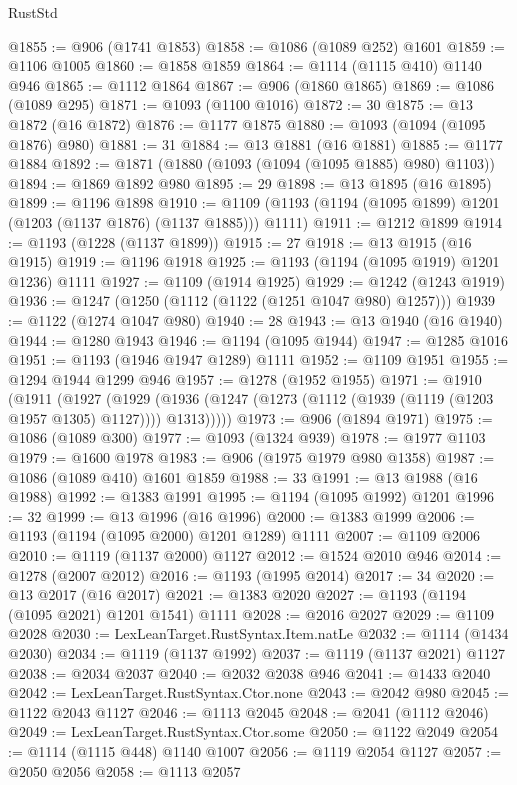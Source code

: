 \begin{lexlean}{RustStd}
\begin{coremodule}
@1855 := @906 (@1741 @1853)
@1858 := @1086 (@1089 @252) @1601
@1859 := @1106 @1005
@1860 := @1858 @1859
@1864 := @1114 (@1115 @410) @1140 @946
@1865 := @1112 @1864
@1867 := @906 (@1860 @1865)
@1869 := @1086 (@1089 @295)
@1871 := @1093 (@1100 @1016)
@1872 := 30
@1875 := @13 @1872 (@16 @1872)
@1876 := @1177 @1875
@1880 := @1093 (@1094 (@1095 @1876) @980)
@1881 := 31
@1884 := @13 @1881 (@16 @1881)
@1885 := @1177 @1884
@1892 := @1871 (@1880 (@1093 (@1094 (@1095 @1885) @980) @1103))
@1894 := @1869 @1892 @980
@1895 := 29
@1898 := @13 @1895 (@16 @1895)
@1899 := @1196 @1898
@1910 := @1109 (@1193 (@1194 (@1095 @1899) @1201 (@1203 (@1137 @1876) (@1137 @1885))) @1111)
@1911 := @1212 @1899
@1914 := @1193 (@1228 (@1137 @1899))
@1915 := 27
@1918 := @13 @1915 (@16 @1915)
@1919 := @1196 @1918
@1925 := @1193 (@1194 (@1095 @1919) @1201 @1236) @1111
@1927 := @1109 (@1914 @1925)
@1929 := @1242 (@1243 @1919)
@1936 := @1247 (@1250 (@1112 (@1122 (@1251 @1047 @980) @1257)))
@1939 := @1122 (@1274 @1047 @980)
@1940 := 28
@1943 := @13 @1940 (@16 @1940)
@1944 := @1280 @1943
@1946 := @1194 (@1095 @1944)
@1947 := @1285 @1016
@1951 := @1193 (@1946 @1947 @1289) @1111
@1952 := @1109 @1951
@1955 := @1294 @1944 @1299 @946
@1957 := @1278 (@1952 @1955)
@1971 := @1910
    (@1911
      (@1927
        (@1929 (@1936 (@1247 (@1273 (@1112 (@1939 (@1119 (@1203 @1957 @1305) @1127)))) @1313)))))
@1973 := @906 (@1894 @1971)
@1975 := @1086 (@1089 @300)
@1977 := @1093 (@1324 @939)
@1978 := @1977 @1103
@1979 := @1600 @1978
@1983 := @906 (@1975 @1979 @980 @1358)
@1987 := @1086 (@1089 @410) @1601 @1859
@1988 := 33
@1991 := @13 @1988 (@16 @1988)
@1992 := @1383 @1991
@1995 := @1194 (@1095 @1992) @1201
@1996 := 32
@1999 := @13 @1996 (@16 @1996)
@2000 := @1383 @1999
@2006 := @1193 (@1194 (@1095 @2000) @1201 @1289) @1111
@2007 := @1109 @2006
@2010 := @1119 (@1137 @2000) @1127
@2012 := @1524 @2010 @946
@2014 := @1278 (@2007 @2012)
@2016 := @1193 (@1995 @2014)
@2017 := 34
@2020 := @13 @2017 (@16 @2017)
@2021 := @1383 @2020
@2027 := @1193 (@1194 (@1095 @2021) @1201 @1541) @1111
@2028 := @2016 @2027
@2029 := @1109 @2028
@2030 := LexLeanTarget.RustSyntax.Item.natLe
@2032 := @1114 (@1434 @2030)
@2034 := @1119 (@1137 @1992)
@2037 := @1119 (@1137 @2021) @1127
@2038 := @2034 @2037
@2040 := @2032 @2038 @946
@2041 := @1433 @2040
@2042 := LexLeanTarget.RustSyntax.Ctor.none
@2043 := @2042 @980
@2045 := @1122 @2043 @1127
@2046 := @1113 @2045
@2048 := @2041 (@1112 @2046)
@2049 := LexLeanTarget.RustSyntax.Ctor.some
@2050 := @1122 @2049
@2054 := @1114 (@1115 @448) @1140 @1007
@2056 := @1119 @2054 @1127
@2057 := @2050 @2056
@2058 := @1113 @2057

\end{coremodule}
\end{lexlean}
